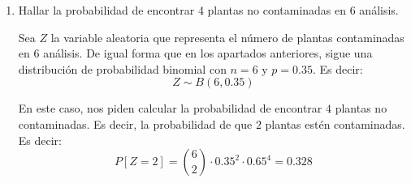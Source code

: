 \begin{ejercicio}
\begin{enumerate}
        \item Hallar la probabilidad de encontrar 4 plantas no contaminadas en 6 análisis.
        
        Sea $Z$ la variable aleatoria que representa el número de plantas contaminadas en $6$ análisis.
        De igual forma que en los apartados anteriores, sigue una distribución de probabilidad binomial con $n=6$ y $p=0.35$. Es decir:
        \begin{equation*}
            Z \sim B(6,0.35)
        \end{equation*}

        En este caso, nos piden calcular la probabilidad de encontrar $4$ plantas no contaminadas. Es decir, la probabilidad de que $2$ plantas estén contaminadas. Es decir:
        \begin{equation*}
            P[Z=2] = \binom{6}{2} \cdot 0.35^2 \cdot 0.65^4 = 0.328
        \end{equation*}
    \end{enumerate}
    
\end{ejercicio}

